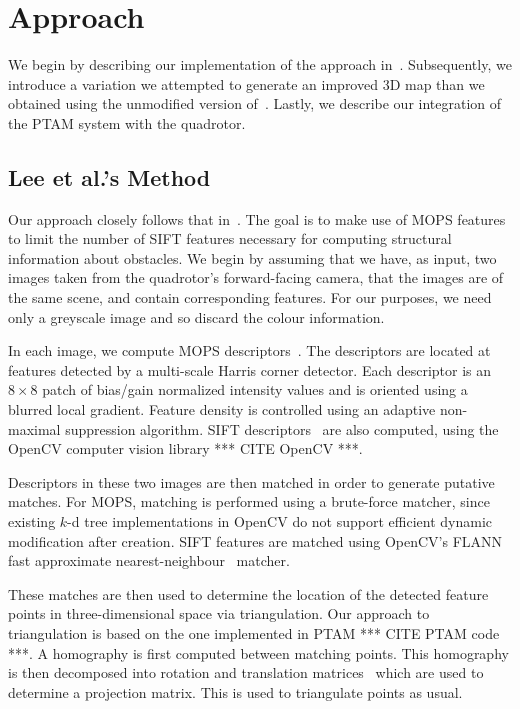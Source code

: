 \documentclass{acmsiggraph}
\begin{document}
\section{Approach}
We begin by describing our implementation of the approach in~\cite{lee2011}. Subsequently, we introduce a variation we attempted to generate an improved 3D map than we obtained using the unmodified version of~\cite{lee2011}.  Lastly, we describe our integration of the PTAM system with the quadrotor.

\subsection{Lee et al.'s Method}
Our approach closely follows that in~\cite{lee2011}. The goal is to make use of MOPS features to limit the number of SIFT features necessary for computing structural information about obstacles. We begin by assuming that we have, as input, two images taken from the quadrotor's forward-facing camera, that the images are of the same scene, and contain corresponding features. For our purposes, we need only a greyscale image and so discard the colour information.

In each image, we compute MOPS descriptors~\cite{BSW05}. The descriptors are located at features detected by a multi-scale Harris corner detector. Each descriptor is an $8 \times 8$ patch of bias/gain normalized intensity values and is oriented using a blurred local gradient. Feature density is controlled using an adaptive non-maximal suppression algorithm. SIFT descriptors~\cite{lowe2004} are also computed, using the OpenCV computer vision library *** CITE OpenCV ***.

Descriptors in these two images are then matched in order to generate putative matches. For MOPS, matching is performed using a brute-force matcher, since existing $k$-d tree implementations in OpenCV do not support efficient dynamic modification after creation. SIFT features are matched using OpenCV's FLANN fast approximate nearest-neighbour~\cite{flann2009} matcher.

These matches are then used to determine the location of the detected feature points in three-dimensional space via triangulation. Our approach to triangulation is based on the one implemented in PTAM *** CITE PTAM code ***. A homography is first computed between matching points. This homography is then decomposed into rotation and translation matrices~\cite{inria2007} which are used to determine a projection matrix. This is used to triangulate points as usual.
\end{document}
